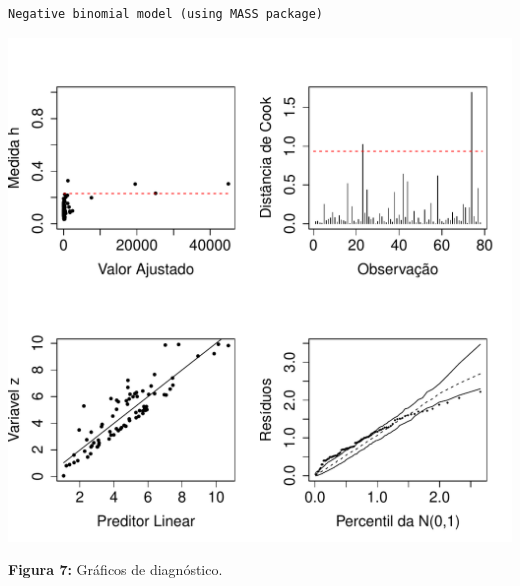 \documentclass[12pt,a4paper]{article}\usepackage[]{graphicx}\usepackage[]{color}
\makeatletter
\def\maxwidth{ %
  \ifdim\Gin@nat@width>\linewidth
    \linewidth
  \else
    \Gin@nat@width
  \fi
}
\newenvironment{kframe}{%
 \def\at@end@of@kframe{}%
 \ifinner\ifhmode%
  \def\at@end@of@kframe{\end{minipage}}%
  \begin{minipage}{\columnwidth}%
 \fi\fi%
 \def\FrameCommand##1{\hskip\@totalleftmargin \hskip-\fboxsep
 \colorbox{shadecolor}{##1}\hskip-\fboxsep
     \hskip-\linewidth \hskip-\@totalleftmargin \hskip\columnwidth}%
 \MakeFramed {\advance\hsize-\width
   \@totalleftmargin\z@ \linewidth\hsize
   \@setminipage}}%
 {\par\unskip\endMakeFramed%
 \at@end@of@kframe}
\newenvironment{knitrout}{}{} %
\makeatother
\begin{document}
\begin{knitrout}
\color{fgcolor}\begin{kframe}
\begin{verbatim}
Negative binomial model (using MASS package) 
\end{verbatim}
\end{kframe}
\includegraphics[width=\maxwidth]{figure/unnamed-chunk-16-1} 

\end{knitrout}
\textbf{Figura 7:} Gráficos de diagnóstico.
\end{document}
